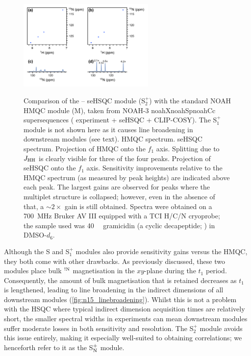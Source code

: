\documentclass[11pt]{article}
\newcommand*{\noahthree}[3]{\csname noah#1\endcsname\csname noah#2\endcsname\csname noah#3\endcsname}
\newcommand*{\noahM}{M}
\newcommand*{\noahS}{S}
\newcommand*{\noahSpa}{S$^+_1$}
\newcommand*{\noahSpb}{S$^+_2$}
\newcommand*{\noahSpn}{S$\rm ^+_N$}
\newcommand*{\carbon}{\ce{^{13}C}}
\newcommand*{\proton}{\ce{^{1}H}}
\newcommand*{\nitrogen}{\ce{^{15}N}}
\newcommand*{\magnnot}[1]{\ce{^1H}$^{!#1}$}
\newcommand*{\jhh}{J_{\ce{HH}}}
\begin{document}
\begin{refsection}
\begin{figure}
    \centering
    \includegraphics[width=0.6\textwidth]{15n_spv2vsm.png}
    {\label{fig:15n_spv2vsm_hmqc}}
    {\label{fig:15n_spv2vsm_spv2}}
    {\label{fig:15n_spv2vsm_hmqc_proj}}
    {\label{fig:15n_spv2vsm_spv2_proj}}
    \caption{
        Comparison of the \nitrogen{}--\proton{} seHSQC module (\noahSpb{}) with the standard NOAH HMQC module (\noahM{}), taken from NOAH-3 \noahthree{X}{Sp}{Cc} supersequences (\nitrogen{} experiment + \carbon{} seHSQC + CLIP-COSY).
        The \noahSpa{} module is not shown here as it causes line broadening in downstream modules (see text).
        \textbf{} \nitrogen{} HMQC spectrum.
        \textbf{} \nitrogen{} seHSQC spectrum.
        \textbf{} Projection of HMQC onto the $f_1$ axis.
        Splitting due to $\jhh$ is clearly visible for three of the four peaks.
        \textbf{} Projection of seHSQC onto the $f_1$ axis.
        Sensitivity improvements relative to the HMQC spectrum (as measured by peak heights) are indicated above each peak.
        The largest gains are observed for peaks where the multiplet structure is collapsed; however, even in the absence of that, a $\sim 2\times$ gain is still obtained.
        Spectra were obtained on a \SI{700}{\MHz} Bruker AV III equipped with a TCI H/C/N cryoprobe; the sample used was \SI{40}{\milli\molar} gramicidin (a cyclic decapeptide; ) in DMSO-$d_6$.
    }
    \label{fig:15n_spv2vsm}
\end{figure}

Although the \noahS{} and \noahSpa{} modules also provide sensitivity gains versus the HMQC, they both come with other drawbacks.
As previously discussed, these two modules place bulk \magnnot{\ce{N}} magnetisation in the $xy$-plane during the $t_1$ period.
Consequently, the amount of bulk magnetisation that is retained decreases as $t_1$ is lengthened, leading to line broadening in the indirect dimensions of all downstream modules (\cref{fig:n15_linebroadening}).
Whilst this is not a problem with the \carbon{} HSQC where typical \carbon{} indirect dimension acquisition times are relatively short, the smaller spectral widths in \nitrogen{} experiments can mean downstream modules suffer moderate losses in both sensitivity and resolution.
The \noahSpb{} module avoids this issue entirely, making it especially well-suited to obtaining \nitrogen{} correlations; we henceforth refer to it as the \noahSpn{} module.


\end{refsection}
\end{document}
